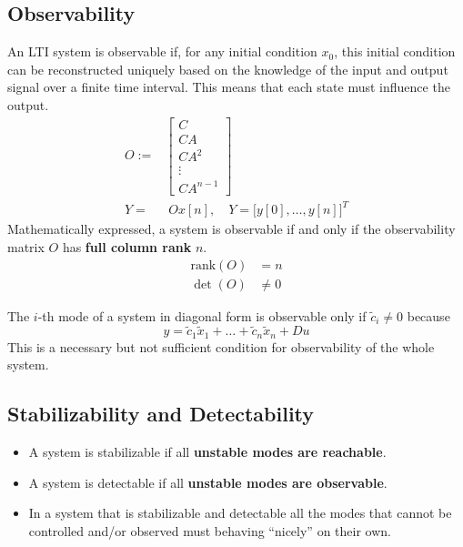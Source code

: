 \subsection{Observability}

An LTI system is observable if, for any initial condition $x_0$, this initial condition can be reconstructed uniquely based on the knowledge of the input and output signal over a finite time interval. This means that each state must influence the output.
\noindent\begin{align*}
    O :=    & \begin{bmatrix}
                 C      \\
                 CA     \\
                 CA^2   \\
                 \vdots \\
                 CA^{n-1}
             \end{bmatrix}\\
    Y = &\; Ox[n],\quad Y={\bigl[y[0],\ldots, y[n]\bigr]}^T
\end{align*}
Mathematically expressed, a system is observable if and only if the observability matrix $O$ has \textbf{full column rank} $n$.
\begin{align*}
    \text{rank}(O) & = n     \\
    \det(O)        & \neq 0
\end{align*}


The $i$-th mode of a system in diagonal form is observable only if $\tilde{c}_i \neq 0$ because
\begin{equation*}
    y=\tilde{c}_1\tilde{x}_1+\ldots+\tilde{c}_n\tilde{x}_n+Du %
\end{equation*}
This is a necessary but not sufficient condition for observability of the whole system.

\subsection{Stabilizability and Detectability}
\begin{itemize}
    \item A system is stabilizable if all \textbf{unstable modes are reachable}.
    \item A system is detectable if all \textbf{unstable modes are observable}.
    \item In a system that is stabilizable and detectable all the modes that cannot be controlled and/or observed must behaving ``nicely'' on their own.
\end{itemize}

